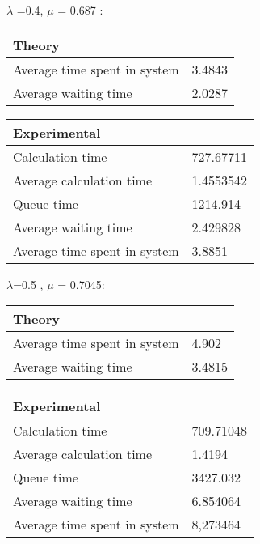 \begin{minipage}{\linewidth}
    $\lambda$ =0.4, $\mu$ = 0.687 :

    \bigskip
    \begin{minipage}{0.45\linewidth}
        \begin{tabular}{|l|l|}
            \hline
            Theory & \\
            \hline
            Average time spent in system & 3.4843 \\
            Average waiting time & 2.0287 \\
            \hline
        \end{tabular}
    \end{minipage}
    \begin{minipage}{0.45\linewidth}
        \begin{tabular}{|l|l|}
            \hline
            Experimental & \\
            \hline
            Calculation time & 727.67711 \\
            Average calculation time & 1.4553542 \\
            Queue time & 1214.914 \\
            Average waiting time & 2.429828 \\
            Average time spent in system & 3.8851 \\
            \hline
        \end{tabular}
    \end{minipage}
    \bigskip
\end{minipage}

\begin{minipage}{\linewidth}
   $\lambda$=0.5 , $\mu$ = 0.7045:

    \bigskip
    \begin{minipage}{0.45\linewidth}
        \begin{tabular}{|l|l|}
            \hline
            Theory & \\
            \hline
            Average time spent in system & 4.902 \\
            Average waiting time & 3.4815 \\
            \hline
        \end{tabular}
    \end{minipage}
    \begin{minipage}{0.45\linewidth}
        \begin{tabular}{|l|l|}
            \hline
            Experimental & \\
            \hline
            Calculation time & 709.71048 \\
            Average calculation time & 1.4194 \\
            Queue time & 3427.032 \\
            Average waiting time & 6.854064 \\
            Average time spent in system & 8,273464 \\
            \hline
        \end{tabular}
    \end{minipage}
    \bigskip
\end{minipage}

